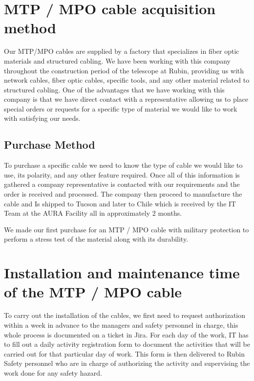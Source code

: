 \section{MTP / MPO cable acquisition method}

  Our MTP/MPO cables are supplied by a factory that specializes in fiber optic materials and structured cabling. We have been working with this company throughout the construction period of the telescope at Rubin, providing us with network cables, fiber optic cables, specific tools, and any other material related to structured cabling. One of the advantages that we have working with this company is that we have direct contact with a representative allowing us to place special orders or requests for a specific type of material we would like to work with satisfying our needs.


\subsection{Purchase Method}

  To purchase a specific cable we need to know the type of cable we would like to use, its polarity, and any other feature required. Once all of this information is gathered a company representative is contacted with our requirements and the order is received and processed. The company then proceed to manufacture the cable and Is shipped to Tucson and later to Chile which is received by the IT Team at the AURA Facility all in approximately 2 months.

  We made our first purchase for an MTP / MPO cable with military protection to perform a stress test of the material along with its durability.

\section{Installation and maintenance time of the MTP / MPO cable}

  To carry out the installation of the cables, we first need to request authorization within a week in advance to the managers and safety personnel in charge, this whole process is documented on a ticket in Jira. For each day of the work, IT has to fill out a daily activity registration form to document the activities that will be carried out for that particular day of work. This form is then delivered to Rubin Safety personnel who are in charge of authorizing the activity and supervising the work done for any safety hazard.

